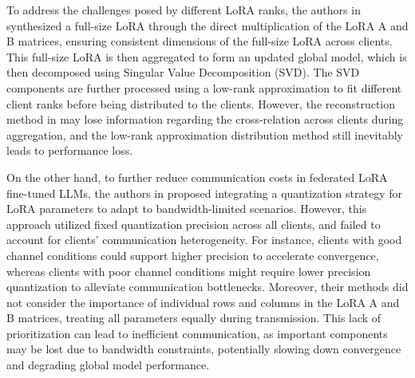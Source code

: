 \documentclass[journal]{IEEEtran}
\begin{document}
To address the challenges posed by different LoRA ranks, the authors in \cite{jiamu2024federated} synthesized a full-size LoRA through the direct multiplication of the LoRA A and B matrices, ensuring consistent dimensions of the full-size LoRA across clients.
This full-size LoRA is then aggregated to form an updated global model, which is then decomposed using Singular Value Decomposition (SVD). The SVD components are further processed using a low-rank approximation to fit different client ranks before being distributed to the clients. However, the reconstruction method in \cite{jiamu2024federated} may lose information regarding the cross-relation across clients during aggregation, and the low-rank approximation distribution method still inevitably leads to performance loss.



On the other hand, to further reduce communication costs in federated LoRA fine-tuned LLMs, the authors in \cite{zhu2024promoting} proposed integrating a quantization strategy for LoRA parameters to adapt to bandwidth-limited scenarios. However, this approach utilized fixed quantization precision across all clients, and failed to account for clients' communication heterogeneity. For instance, clients with good channel conditions could support higher precision to accelerate convergence, whereas clients with poor channel conditions might require lower precision quantization to alleviate communication bottlenecks. Moreover, their methods did not consider the importance of individual rows and columns in the LoRA A and B matrices, treating all parameters equally during transmission. This lack of prioritization can lead to inefficient communication, as important components may be lost due to bandwidth constraints, potentially slowing down convergence and degrading global model performance.
\end{document}
